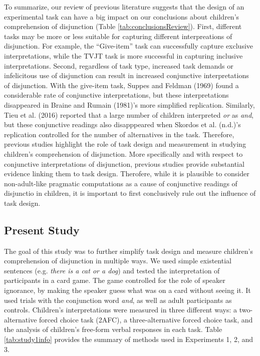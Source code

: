 \documentclass[,man,floatsintext]{apa6}
\begin{document}
To summarize, our review of previous literature suggests that the design of an experimental task can have a big impact on our conclusions about children's comprehension of disjunction (Table \ref{tab:conclusionsReview}). First, different tasks may be more or less suitable for capturing different interpreations of disjunction. For example, the \enquote{Give-item} task can successfully capture exclusive interpretations, while the TVJT task is more successful in capturing inclusive interpretations. Second, regardless of task type, increased task demands or infelicitous use of disjunction can result in increased conjunctive interpretations of disjunction. With the give-item task, Suppes and Feldman (1969) found a considerable rate of conjunctive interpretations, but these interpretations disappeared in Braine and Rumain (1981)'s more simplified replication. Similarly, Tieu et al. (2016) reported that a large number of children interpreted \emph{or} as \emph{and}, but these conjunctive readings also disapppeared when Skordos et al. (n.d.)'s replication controlled for the number of alternatives in the task. Therefore, previous studies highlight the role of task design and measurement in studying children's comprehension of disjunction. More specifically and with respect to conjunctive interpretations of disjunction, previous studies provide substantial evidence linking them to task design. Therofere, while it is plausible to consider non-adult-like pragmatic computations as a cause of conjunctive readings of disjunctio in children, it is important to first conclusively rule out the influence of task design.

\hypertarget{present-study}{%
\subsection{Present Study}\label{present-study}}

The goal of this study was to further simplify task design and measure children's comprehension of disjunction in multiple ways. We used simple existential sentences (e.g. \emph{there is a cat or a dog}) and tested the interpretation of participants in a card game. The game controlled for the role of speaker ignorance, by making the speaker guess what was on a card without seeing it. It used trials with the conjunction word \emph{and}, as well as adult participants as controls. Children's interpretations were measured in three different ways: a two-alternative forced choice task (2AFC), a three-alternative forced choice task, and the analysis of children's free-form verbal responses in each task. Table \ref{tab:study1info} provides the summary of methods used in Experiments 1, 2, and 3.
\end{document}
